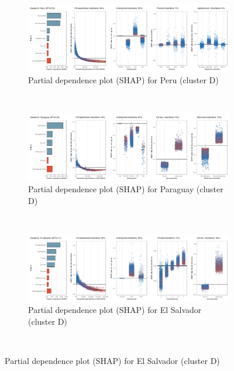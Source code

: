 \begin{figure}[ht!]\ContinuedFloat
    \centering
   \begin{subfigure}[b]{\textwidth}  
   \centering
         \caption{Partial dependence plot (SHAP) for Peru (cluster D)}
         \label{fig:5b_PER}
         \includegraphics[width=\textwidth]{Figure 5b/Figure_5b_PER}    
    \end{subfigure}
    \\
    \vspace{0.5cm}
    \begin{subfigure}[b]{\textwidth}
   \centering
         \caption{Partial dependence plot (SHAP) for Paraguay (cluster D)}
         \label{fig:5b_PRY}
         \includegraphics[width=\textwidth]{Figure 5b/Figure_5b_PRY}
         \end{subfigure}
    \\
    \vspace{0.5cm}
   \begin{subfigure}[b]{\textwidth}        
    \centering
         \caption{Partial dependence plot (SHAP) for El Salvador (cluster D)}
         \label{fig:5b_SLV}
         \includegraphics[width=\textwidth]{Figure 5b/Figure_5b_SLV}
    \end{subfigure}
    \\
    \vspace{0.5cm}
   

\end{figure}
